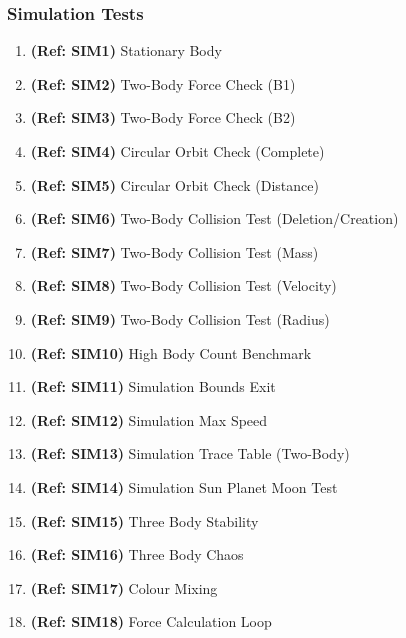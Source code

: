 \subsubsection{Simulation Tests}
\vspace{12pt}
\begin{enumerate}
\item \textbf{(Ref: SIM1)} Stationary Body
\item \textbf{(Ref: SIM2)} Two-Body Force Check (B1)
\item \textbf{(Ref: SIM3)} Two-Body Force Check (B2)
\item \textbf{(Ref: SIM4)} Circular Orbit Check (Complete)
\item \textbf{(Ref: SIM5)} Circular Orbit Check (Distance)
\item \textbf{(Ref: SIM6)} Two-Body Collision Test (Deletion/Creation)
\item \textbf{(Ref: SIM7)} Two-Body Collision Test (Mass)
\item \textbf{(Ref: SIM8)} Two-Body Collision Test (Velocity)
\item \textbf{(Ref: SIM9)} Two-Body Collision Test (Radius)
\item \textbf{(Ref: SIM10)} High Body Count Benchmark
\item \textbf{(Ref: SIM11)} Simulation Bounds Exit
\item \textbf{(Ref: SIM12)} Simulation Max Speed
\item \textbf{(Ref: SIM13)} Simulation Trace Table (Two-Body)
\item \textbf{(Ref: SIM14)} Simulation Sun Planet Moon Test
\item \textbf{(Ref: SIM15)} Three Body Stability
\item \textbf{(Ref: SIM16)} Three Body Chaos
\item \textbf{(Ref: SIM17)} Colour Mixing
\item \textbf{(Ref: SIM18)} Force Calculation Loop
\end{enumerate}